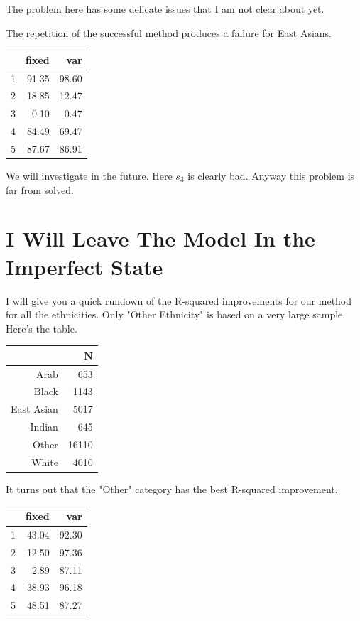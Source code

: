 \documentclass{amsart}
\begin{document}
The problem here has some delicate issues that I am not clear about yet.  

The repetition of the successful method produces a failure for East Asians.

\begin{table}[ht]
\centering
\begin{tabular}{rrr}
  \hline
 & fixed & var \\ 
  \hline
1 & 91.35 & 98.60 \\ 
  2 & 18.85 & 12.47 \\ 
  3 & 0.10 & 0.47 \\ 
  4 & 84.49 & 69.47 \\ 
  5 & 87.67 & 86.91 \\ 
   \hline
\end{tabular}
\end{table}

We will investigate in the future.  Here $s_3$ is clearly bad.  Anyway this problem is far from solved.

\section{I Will Leave The Model In the Imperfect State}

I will give you a quick rundown of the R-squared improvements for our method for all the ethnicities.  Only "Other Ethnicity" is based on a very large sample.  Here's the table.

\begin{table}[ht]
\centering
\begin{tabular}{rr}
  \hline
 & N \\ 
  \hline
Arab & 653 \\ 
  Black & 1143 \\ 
  East Asian & 5017 \\ 
  Indian & 645 \\ 
  Other & 16110 \\ 
  White & 4010 \\ 
   \hline
\end{tabular}
\end{table}

It turns out that the "Other" category has the best R-squared improvement.

\begin{table}[ht]
\centering
\begin{tabular}{rrr}
  \hline
 & fixed & var \\ 
  \hline
1 & 43.04 & 92.30 \\ 
  2 & 12.50 & 97.36 \\ 
  3 & 2.89 & 87.11 \\ 
  4 & 38.93 & 96.18 \\ 
  5 & 48.51 & 87.27 \\ 
   \hline
\end{tabular}
\end{table}
\end{document}
